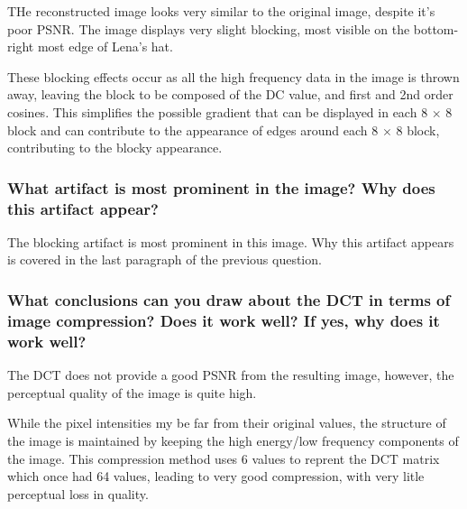 THe reconstructed image looks very similar to the original image, despite it's poor PSNR. The image displays very slight blocking, most visible on the bottom-right most edge of Lena's hat.

These blocking effects occur as all the high frequency data in the image is thrown away, leaving the block to be composed of the DC value, and first and 2nd order cosines. This simplifies the possible gradient that can be displayed in each 8 $\times$ 8 block and can contribute to the appearance of edges around each 8 $\times$ 8 block, contributing to the blocky appearance.


\subsubsection{What artifact is most prominent in the image? Why does this artifact appear?}

The blocking artifact is most prominent in this image. Why this artifact appears is covered in the last paragraph of the previous question.

\subsubsection{What conclusions can you draw about the DCT in terms of image compression? Does it work well? If yes, why does it work well?}

The DCT does not provide a good PSNR from the resulting image, however, the perceptual quality of the image is quite high.

While the pixel intensities my be far from their original values, the structure of the image is maintained by keeping the high energy/low frequency components of the image. This compression method uses 6 values to reprent the DCT matrix which once had 64 values, leading to very good compression, with very litle perceptual loss in quality.